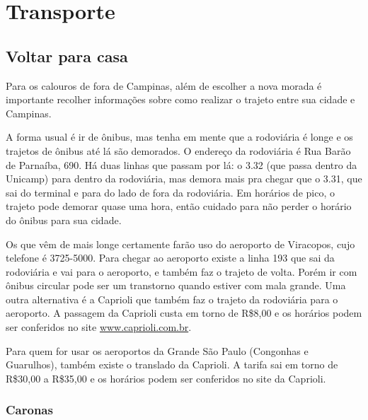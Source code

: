 
\section{Transporte}
\subsection{Voltar para casa}

Para os calouros de fora de Campinas, além de escolher a nova morada
é importante recolher informações sobre como realizar o trajeto entre sua cidade
e Campinas.

A forma usual é ir de ônibus, mas tenha em mente que a rodoviária é longe e os
trajetos de ônibus até lá são demorados. O endereço da rodoviária é Rua Barão de
Parnaíba, 690. Há duas linhas que passam por lá: o 3.32 (que passa dentro da
Unicamp) para dentro da rodoviária, mas demora mais pra chegar que o 3.31, que
sai do terminal e para do lado de fora da rodoviária. Em horários de pico,
o trajeto pode demorar quase uma hora, então cuidado para não perder o horário
do ônibus para sua cidade.

Os que vêm de mais longe certamente farão uso do aeroporto de Viracopos, cujo
telefone é 3725-5000. Para chegar ao aeroporto existe a linha 193 que sai da
rodoviária e vai para o aeroporto, e também faz o trajeto de volta. Porém ir com
ônibus circular pode ser um transtorno quando estiver com mala grande. Uma outra
alternativa é a Caprioli que também faz o trajeto da rodoviária para
o aeroporto. A passagem da Caprioli custa em torno de R\$8,00 e os horários
podem ser conferidos no site \url{www.caprioli.com.br}.

Para quem for usar os aeroportos da Grande São Paulo (Congonhas e Guarulhos),
também existe o translado da Caprioli. A tarifa sai em torno de R\$30,00
a R\$35,00 e os horários podem ser conferidos no site da Caprioli.

\subsubsection{Caronas}

